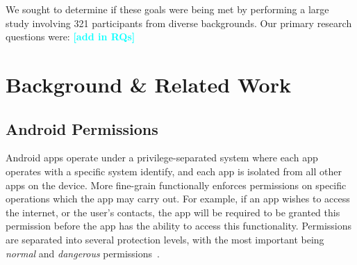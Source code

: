 \documentclass{sig-alternate-05-2015}
\newcommand{\todo}[1]{\textcolor{cyan}{\textbf{[#1]}}}
\begin{document}



We sought to determine if these goals were being met by performing a large study involving 321 participants from  diverse backgrounds. Our primary research questions were: \todo{add in RQs}















\section{Background \& Related Work}
\label{sec:relatedworks}





\subsection{Android Permissions}


Android apps operate under a privilege-separated system where each app operates with a specific system identify, and each app is isolated from all other apps on the device. More fine-grain functionally enforces permissions on specific operations which the app may carry out. For example, if an app wishes to access the internet, or the user's contacts, the app will be required to be granted this permission before the app has the ability to access this functionality. Permissions are separated into several protection levels, with the most important being \emph{normal} and \emph{dangerous} permissions~\cite{android_permissions_URL}. 
\end{document}
